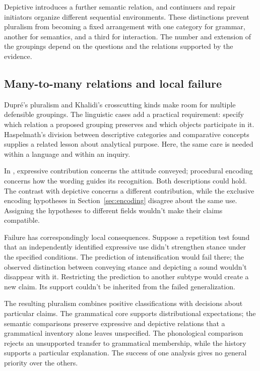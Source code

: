 \documentclass[12pt]{article}
\begin{document}
Depictive  introduces a further semantic relation, and continuers
and repair initiators organize different sequential environments. These
distinctions prevent pluralism from becoming a fixed arrangement with
one category for grammar, another for semantics, and a third for interaction.
The number and extension of the groupings depend on the questions
and the relations supported by the evidence.

\subsection{Many-to-many relations and local failure}

Dupr\'e's pluralism and Khalidi's crosscutting kinds make room for
multiple defensible groupings. The linguistic cases add a practical
requirement: specify which relation a proposed grouping preserves and
which objects participate in it. Haspelmath's division between descriptive
categories and comparative concepts supplies a related lesson about
analytical purpose. Here, the same care is needed within a language
and within an inquiry.

In , expressive contribution concerns
the attitude conveyed; procedural encoding concerns how the wording
guides its recognition. Both descriptions could hold. The contrast with
depictive  concerns a different contribution, while the
exclusive encoding hypotheses in Section~\ref{sec:encoding} disagree about
the same use. Assigning the hypotheses to different fields wouldn't
make their claims compatible.

Failure has correspondingly local consequences. Suppose a repetition
test found that an independently identified expressive use didn't
strengthen stance under the specified conditions. The prediction of
intensification would fail there; the observed distinction between
conveying stance and depicting a sound wouldn't disappear with it.
Restricting the prediction to another subtype would create a new
claim. Its support couldn't be inherited from the failed generalization.

The resulting pluralism combines positive classifications with decisions
about particular claims. The grammatical core supports distributional
expectations; the semantic comparisons preserve expressive and depictive
relations that a grammatical inventory alone leaves unspecified.
The phonological comparison rejects an unsupported transfer to grammatical
membership, while the  history supports a particular explanation.
The success of one analysis gives no general priority over the others.
\end{document}
